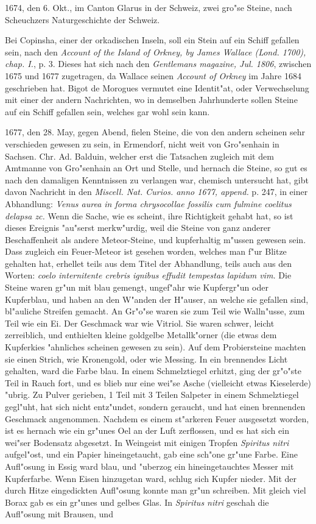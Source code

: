 \documentclass[a4paper, 11pt, oneside, polutonikogreek, german]{article}
\begin{document}
1674, den 6. Okt., im Canton Glarus in der Schweiz, zwei gro"se Steine, nach Scheuchzers Naturgeschichte der Schweiz.

Bei Copinsha, einer der orkadischen Inseln, soll ein Stein auf ein Schiff gefallen sein, nach den \emph{Account of the Island of Orkney, by James Wallace (Lond. 1700), chap. I.}, p. 3. Dieses hat sich nach den \emph{Gentlemans magazine, Jul. 1806}, zwischen 1675 und 1677 zugetragen, da Wallace seinen \emph{Account of Orkney} im Jahre 1684 geschrieben hat. Bigot de Morogues vermutet eine Identit"at, oder Verwechselung mit einer der andern Nachrichten, wo in demselben Jahrhunderte sollen Steine auf ein Schiff gefallen sein, welches gar wohl sein kann.

1677, den 28. May, gegen Abend, fielen Steine, die von den andern scheinen sehr verschieden gewesen zu sein, in Ermendorf, nicht weit von Gro"senhain in Sachsen. Chr. Ad. Balduin, welcher erst die Tatsachen zugleich mit dem Amtmanne von Gro"senhain an Ort und Stelle, und hernach die Steine, so gut es nach den damaligen Kenntnissen zu verlangen war, chemisch untersucht hat, gibt davon Nachricht in den \emph{Miscell. Nat. Curios. anno 1677, append.} p. 247, in einer Abhandlung: \emph{Venus aurea in forma chrysocollae fossilis cum fulmine coelitus delapsa zc.} Wenn die Sache, wie es scheint, ihre Richtigkeit gehabt hat, so ist dieses Ereignis "au"serst merkw"urdig, weil die Steine von ganz anderer Beschaffenheit als andere Meteor-Steine, und kupferhaltig m"ussen gewesen sein. Dass zugleich ein Feuer-Meteor ist gesehen worden, welches man f"ur Blitze gehalten hat, erhellet teils aus dem Titel der Abhandlung, teils auch aus den Worten: \emph{coelo internitente crebris ignibus effudit tempestas lapidum vim.} Die Steine waren gr"un mit blau gemengt, ungef"ahr wie Kupfergr"un oder Kupferblau, und haben an den W"anden der H"auser, an welche sie gefallen sind, bl"auliche Streifen gemacht. An Gr"o"se waren sie zum Teil wie Walln"usse, zum Teil wie ein Ei. Der Geschmack war wie Vitriol. Sie waren schwer, leicht zerreiblich, und enthielten kleine goldgelbe Metallk"orner (die etwas dem Kupferkies "ahnliches scheinen gewesen zu sein). Auf dem Probiersteine machten sie einen Strich, wie Kronengold, oder wie Messing. In ein brennendes Licht gehalten, ward die Farbe blau. In einem Schmelztiegel erhitzt, ging der gr"o"ste Teil in Rauch fort, und es blieb nur eine wei"se Asche (vielleicht etwas Kieselerde) "ubrig. Zu Pulver gerieben, 1 Teil mit 3 Teilen Salpeter in einem Schmelztiegel gegl"uht, hat sich nicht entz"undet, sondern geraucht, und hat einen brennenden Geschmack angenommen. Nachdem es einem st"arkeren Feuer ausgesetzt worden, ist es hernach wie ein gr"unes Oel an der Luft zerflossen, und es hat sich ein wei"ser Bodensatz abgesetzt. In Weingeist mit einigen Tropfen \emph{Spiritus nitri} aufgel"ost, und ein Papier hineingetaucht, gab eine sch"one gr"une Farbe. Eine Aufl"osung in Essig ward blau, und "uberzog ein hineingetauchtes Messer mit Kupferfarbe. Wenn Eisen hinzugetan ward, schlug sich Kupfer nieder. Mit der durch Hitze eingedickten Aufl"osung konnte man gr"un schreiben. Mit gleich viel Borax gab es ein gr"unes und gelbes Glas. In \emph{Spiritus nitri} geschah die Aufl"osung mit Brausen, und 
\end{document}
